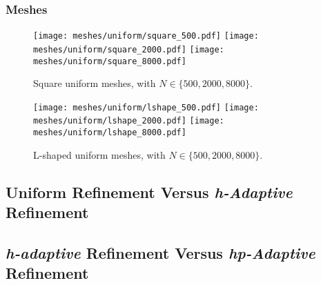 \begin{frame}
    \frametitle{Meshes}

    \begin{figure}[!ht]
        \centering
        \texttt{[image: meshes/uniform/square\_500.pdf]}
        \texttt{[image: meshes/uniform/square\_2000.pdf]}
        \texttt{[image: meshes/uniform/square\_8000.pdf]}
        \caption{Square uniform meshes, with $N \in \{500, 2000, 8000\}$.}
    \end{figure}

    \begin{figure}[!ht]
        \centering
        \texttt{[image: meshes/uniform/lshape\_500.pdf]}
        \texttt{[image: meshes/uniform/lshape\_2000.pdf]}
        \texttt{[image: meshes/uniform/lshape\_8000.pdf]}
        \caption{L-shaped uniform meshes, with $N \in \{500, 2000, 8000\}$.}
    \end{figure}
\end{frame}

\subsection{Uniform Refinement Versus \textit{h-Adaptive} Refinement}

\subsection{\textit{h-adaptive} Refinement Versus \textit{hp-Adaptive} Refinement}